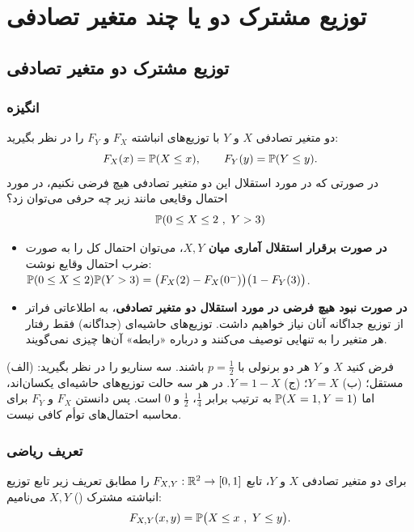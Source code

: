 \chapter{توزیع مشترک دو یا چند متغیر تصادفی}

\section{توزیع مشترک دو متغیر تصادفی }

\subsection{انگیزه}
دو متغیر تصادفی $X$ و $Y$ با توزیع‌های انباشته $F_X$ و $F_Y$ را در نظر بگیرید:
\[
F_X(x)=\mathbb{P}(X\le x),\qquad F_Y(y)=\mathbb{P}(Y\le y).
\]
در صورتی که در مورد استقلال این دو متغیر تصادفی هیچ فرضی نکنیم، در مورد احتمال وقایعی مانند زیر چه حرفی می‌توان زد؟
\[
\Prob(0\le X\le2\ ,\ Y>3)
\]
\begin{itemize}
\item \textbf{در صورت برقرار استقلال آماری میان $X,Y$}، می‌توان احتمال کل را به صورت ضرب احتمال وقایع نوشت:
$\mathbb{P}(0\le X\le2)\mathbb{P}(Y>3)=\big(F_X(2)-F_X(0^-)\big)\big(1-F_Y(3)\big)$.
\item \textbf{در صورت نبود هیچ فرضی در مورد استقلال دو متغیر تصادفی}، به اطلاعاتی فراتر از توزیع جداگانه آنان نیاز خواهیم داشت. توزیع‌های حاشیه‌ای (جداگانه) فقط رفتار هر متغیر را به تنهایی توصیف می‌کنند و درباره «رابطه» آن‌ها چیزی نمی‌گویند.
\end{itemize}

\begin{example}
فرض کنید $X$ و $Y$ هر دو برنولی با $p=\frac12$ باشند. سه سناریو را در نظر بگیرید: (الف) مستقل؛ (ب) $Y=X$؛ (ج) $Y=1-X$. در هر سه حالت توزیع‌های حاشیه‌ای یکسان‌اند، اما $\mathbb{P}(X=1,Y=1)$ به ترتیب برابر $\frac14$، $\frac12$ و $0$ است. پس دانستن $F_X$ و $F_Y$ برای محاسبه احتمال‌های توأم کافی نیست.
\end{example}

\subsection{تعریف ریاضی}
\begin{definition}
برای دو متغیر تصادفی $X$ و $Y$، تابع $F_{X,Y}:\mathbb{R}^2\to[0,1]$ را مطابق تعریف زیر تابع توزیع انباشته مشترک () $X,Y$ می‌نامیم:
\[
F_{X,Y}(x,y)=\Prob\big(X\le x\ ,\ Y\le y\big).
\]
\end{definition}

